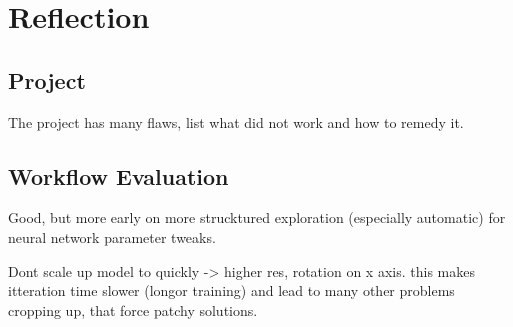 
\chapter{Reflection}
\section{Project}
The project has many flaws, list what did not work and how to remedy it.

\section{Workflow Evaluation}
Good, but more early on more strucktured exploration (especially automatic) for neural network parameter tweaks.

Dont scale up model to quickly -> higher res, rotation on x axis. this makes itteration time slower (longor training) and lead to many other problems cropping up, that force patchy solutions.
